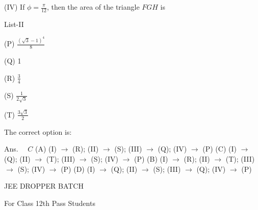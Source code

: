 \documentclass[10pt]{article}
\begin{document}
(IV) If $\phi=\frac{\pi}{12}$, then the area of the triangle $F G H$ is

List-II

(P) $\frac{(\sqrt{3}-1)^{4}}{8}$

(Q) 1

(R) $\frac{3}{4}$

(S) $\frac{1}{2 \sqrt{3}}$

(T) $\frac{3 \sqrt{3}}{2}$

The correct option is:

Ans. $\quad C$
(A) (I) $\rightarrow$ (R); (II) $\rightarrow$ (S); (III) $\rightarrow$ (Q); (IV) $\rightarrow$ (P)
(C) (I) $\rightarrow$ (Q); (II) $\rightarrow$ (T); (III) $\rightarrow$ (S); (IV) $\rightarrow$ (P)
(B) (I) $\rightarrow$ (R); (II) $\rightarrow$ (T); (III) $\rightarrow$ (S); (IV) $\rightarrow$ (P)
(D) (I) $\rightarrow$ (Q); (II) $\rightarrow$ (S); (III) $\rightarrow$ (Q); (IV) $\rightarrow$ (P)

JEE DROPPER BATCH

For Class 12th Pass Students
\end{document}
